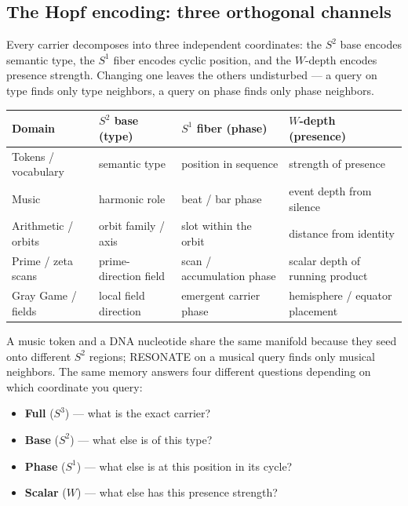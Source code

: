 \documentclass[12pt,a4paper]{article}
\theoremstyle{definition}
\theoremstyle{remark}
\begin{document}
\subsection{The Hopf encoding: three orthogonal channels}

Every carrier decomposes into three independent coordinates: the $S^2$ base
encodes semantic type, the $S^1$ fiber encodes cyclic position, and the
$W$-depth encodes presence strength. Changing one leaves the others
undisturbed --- a query on type finds only type neighbors, a query on phase
finds only phase neighbors.

\begin{center}
\footnotesize
\begin{tabular}{p{2.8cm}p{3.5cm}p{3.5cm}p{3.5cm}}
\toprule
\textbf{Domain} & \textbf{$S^2$ base (type)} & \textbf{$S^1$ fiber (phase)} & \textbf{$W$-depth (presence)} \\
\midrule
Tokens / vocabulary  & semantic type           & position in sequence          & strength of presence \\
Music                & harmonic role           & beat / bar phase              & event depth from silence \\
Arithmetic / orbits  & orbit family / axis     & slot within the orbit         & distance from identity \\
Prime / zeta scans   & prime-direction field   & scan / accumulation phase     & scalar depth of running product \\
Gray Game / fields   & local field direction   & emergent carrier phase        & hemisphere / equator placement \\
\bottomrule
\end{tabular}
\end{center}

A music token and a DNA nucleotide share the same manifold because they
seed onto different $S^2$ regions; RESONATE on a musical query finds only
musical neighbors. The same memory answers four different questions depending
on which coordinate you query:
\begin{itemize}
  \item \textbf{Full} ($S^3$) --- what is the exact carrier?
  \item \textbf{Base} ($S^2$) --- what else is of this type?
  \item \textbf{Phase} ($S^1$) --- what else is at this position in its cycle?
  \item \textbf{Scalar} ($W$) --- what else has this presence strength?
\end{itemize}
\end{document}
